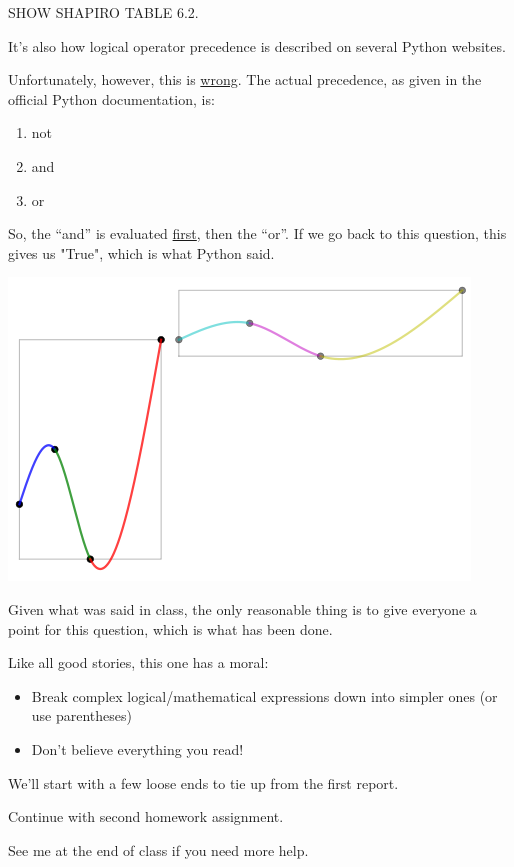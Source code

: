 SHOW SHAPIRO TABLE 6.2.

It's also how logical operator precedence is described on several Python websites. 

Unfortunately, however, this is \underline{wrong}. The actual precedence, as given in the official Python documentation, is:

\begin{board}
\begin{enumerate}
\item not
\item and
\item or
\end{enumerate}
\end{board}

So, the ``and'' is evaluated \underline{first}, then the ``or''. If we go back to this question, this gives us "True", which is what Python said.

\includegraphics{./spline_transformed.png}

Given what was said in class, the only reasonable thing is to give everyone a point for this question, which is what has been done.

Like all good stories, this one has a moral:

\begin{board}
\begin{itemize}
\item Break complex logical/mathematical expressions down into simpler ones (or use parentheses)
\item Don't believe everything you read!
\end{itemize}
\end{board}

We'll start with a few loose ends to tie up from the first report.


\begin{activity}
Continue with second homework assignment.
\end{activity}

\begin{finish}
See me at the end of class if you need more help.
\end{finish}

